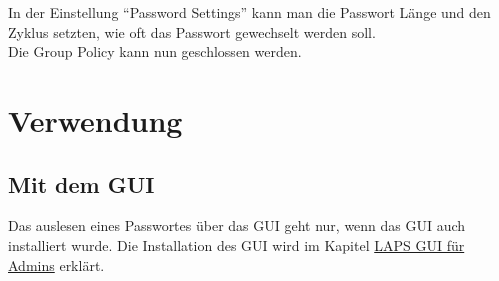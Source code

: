 In der Einstellung ``Password Settings'' kann man die Passwort Länge und den Zyklus setzten, wie oft das Passwort gewechselt werden soll.\\

Die Group Policy kann nun geschlossen werden.


\section{Verwendung}
\subsection{Mit dem GUI}\label{subsec:laps-gui-usage}
Das auslesen eines Passwortes über das GUI geht nur, wenn das GUI auch installiert wurde.
Die Installation des GUI wird im Kapitel \hyperref[subsubsec:Laps-Gui]{LAPS GUI für Admins} erklärt.\\

